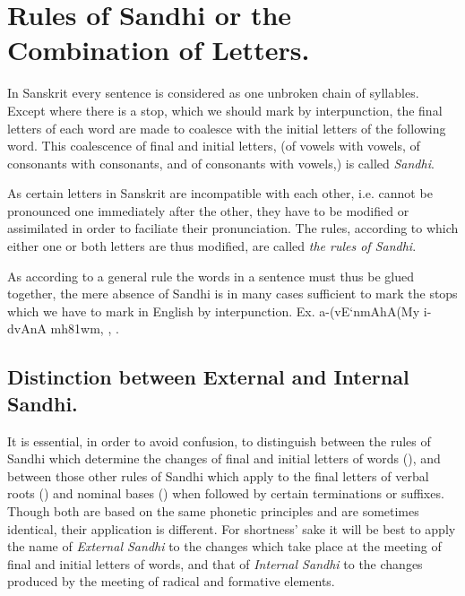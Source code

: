 \def\DevnagVersion{2.17}%
\chapter{Rules of Sandhi or the Combination of Letters.}

\s In Sanskrit every sentence is considered as one unbroken chain of
syllables. Except where there is a stop, which we should mark by
interpunction, the final letters of each word are made to coalesce with
the initial letters of the following word. This coalescence of final and
initial letters, (of vowels with vowels, of consonants with consonants,
and of consonants with vowels,) is called \emph{Sandhi}.

As certain letters in Sanskrit are incompatible with each other, i.e.
cannot be pronounced one immediately after the other, they have to be
modified or assimilated in order to faciliate their pronunciation. The
rules, according to which either one or both letters are thus modified,
are called \emph{the rules of Sandhi}.

As according to a general rule the words in a sentence must thus be
glued together, the mere absence of Sandhi is in many cases sufficient
to mark the stops which we have to mark in English by interpunction. Ex.
{\dn a-(vE`nmAhA(My\2 i\2- d\?vAnA\2 mh\381wm,}
, .

\section{Distinction between External and Internal Sandhi.}

\s It is essential, in order to avoid confusion, to distinguish between
the rules of Sandhi which determine the changes of final and initial
letters of words (), and between those other rules of Sandhi
which apply to the final letters of verbal roots () and
nominal bases () when followed by certain terminations
or suffixes. Though both are based on the same phonetic principles and
are sometimes identical, their application is different. For shortness'
sake it will be best to apply the name of \emph{External Sandhi} to the
changes which take place at the meeting of final and initial letters of
words, and that of \emph{Internal Sandhi} to the changes produced by the
meeting of radical and formative elements.

